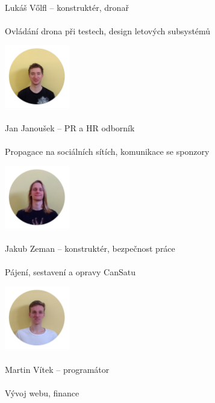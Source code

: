 \documentclass[a4paper]{report}
\newenvironment{MulticolFigure}
  {\par\medskip\noindent\minipage{\linewidth}}
  {\endminipage\par\medskip}
\begin{document}
\begin{multicols}{2}
\begin{center}
\paragraph{} \large Lukáš Vőlfl – konstruktér, dronař
\paragraph{} \normalsize Ovládání drona při testech, design letových subsystémů
\begin{MulticolFigure}
\centering
\includegraphics[width=80pt]{honza.png}
\end{MulticolFigure}
\paragraph{} \large Jan Janoušek – PR a HR odborník
\paragraph{} \normalsize Propagace na sociálních sítích, komunikace se sponzory
\begin{MulticolFigure}
\centering
\includegraphics[width=80pt]{zman.png}
\end{MulticolFigure}
\paragraph{} \large Jakub Zeman – konstruktér, bezpečnost práce
\paragraph{} \normalsize Pájení, sestavení a opravy CanSatu
\begin{MulticolFigure}
\centering
\includegraphics[width=80pt]{vitek.png}
\end{MulticolFigure}
\paragraph{} \large Martin Vítek – programátor
\paragraph{} \normalsize Vývoj webu, finance
\end{center}
\end{multicols}
\end{document}

